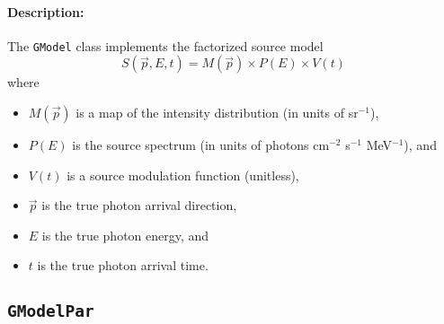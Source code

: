 \documentclass{article}[12pt,a4]
\begin{document}
\paragraph{Description:}
The {\tt GModel} class implements the factorized source model
\begin{equation}
S(\vec{p}, E, t) = M(\vec{p}) \times P(E) \times V(t)
\end{equation}
where
\begin{itemize}
\item[] $M(\vec{p})$ is a map of the intensity distribution (in units of sr$^{-1}$),
\item[] $P(E)$ is the source spectrum (in units of photons cm$^{-2}$ s$^{-1}$ MeV$^{-1}$), and
\item[] $V(t)$ is a source modulation function (unitless),
\item[] $\vec{p}$ is the true photon arrival direction,
\item[] $E$ is the true photon energy, and
\item[] $t$ is the true photon arrival time.
\end{itemize}


\newpage
\subsection{{\tt GModelPar}}
\end{document}
